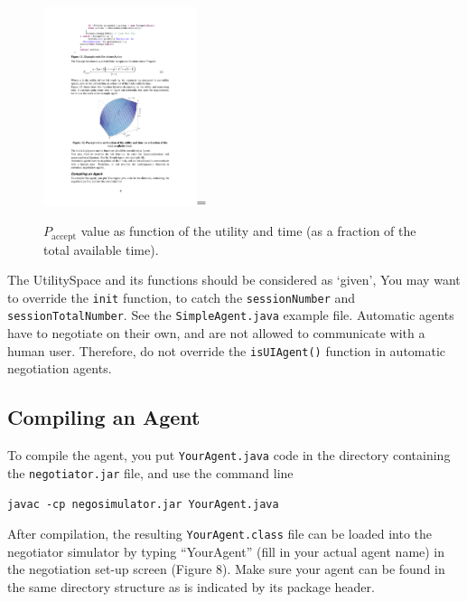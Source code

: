 \documentclass[]{article}
\begin{document}
\begin{figure}[htb]
	\centering
	\includegraphics[width=0.4\textwidth]{media/image21.pdf}=
	\caption{$P_\text{accept}$ value as function of the utility and time (as a fraction of the total available time).}\label{Fig:Paccept}
\end{figure}
 
The UtilitySpace and its functions should be considered as `given',  
You may want to override the \texttt{init} function, to catch the \texttt{sessionNumber} and \texttt{sessionTotalNumber}. See the \texttt{SimpleAgent.java} example file.
Automatic agents have to negotiate on their own, and are not allowed to communicate with a human user. Therefore, do not override the \texttt{isUIAgent()} function in automatic negotiation agents.

\subsection{Compiling an Agent}

To compile the agent, you put \texttt{YourAgent.java} code in the directory containing the \texttt{negotiator.jar} file, and use the command line

\texttt{javac -cp negosimulator.jar YourAgent.java}

After compilation, the resulting \texttt{YourAgent.class} file can be loaded into the negotiator simulator by typing ``YourAgent'' (fill in your actual agent name) in the negotiation set-up screen (Figure 8). Make sure your agent can be found in the same directory structure as is indicated by its package header.
 
\end{document}
